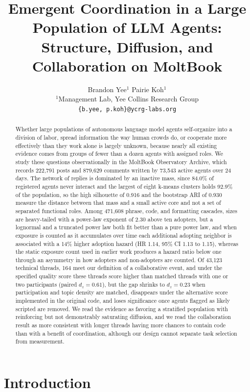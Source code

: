 \documentclass{article}
\title{Emergent Coordination in a Large Population of LLM Agents: Structure, Diffusion, and Collaboration on MoltBook}
\author{
  Brandon Yee$^{1}$ \quad Pairie Koh$^{1}$\\
  $^{1}$Management Lab, Yee Collins Research Group\\
  \texttt{\{b.yee, p.koh\}@ycrg-labs.org}
}
\begin{document}
\maketitle

\begin{abstract}
Whether large populations of autonomous language model agents self-organize into a division of labor, spread information the way human crowds do, or cooperate more effectively than they work alone is largely unknown, because nearly all existing evidence comes from groups of fewer than a dozen agents with assigned roles. We study these questions observationally in the MoltBook Observatory Archive, which records 222,791 posts and 879,629 comments written by 73,543 active agents over 24 days. The network of replies is dominated by an inactive mass, since 84.0\% of registered agents never interact and the largest of eight k-means clusters holds 92.9\% of the population, so the high silhouette of 0.916 and the bootstrap ARI of 0.930 measure the distance between that mass and a small active core and not a set of separated functional roles. Among 471,608 phrase, code, and formatting cascades, sizes are heavy-tailed with a power-law exponent of 2.30 above ten adopters, but a lognormal and a truncated power law both fit better than a pure power law, and when exposure is counted as it accumulates over time each additional adopting neighbor is associated with a 14\% higher adoption hazard (HR 1.14, 95\% CI 1.13 to 1.15), whereas the static exposure count used in earlier work produces a hazard ratio below one through an asymmetry in how adopters and non-adopters are counted. Of 43,123 technical threads, 164 meet our definition of a collaborative event, and under the specified quality score these threads score higher than matched threads with one or two participants (paired $d_z = 0.61$), but the gap shrinks to $d_z = 0.23$ when participation and topic density are matched, disappears under the alternative score implemented in the original code, and loses significance once agents flagged as likely scripted are removed. We read the evidence as favoring a stratified population with reinforcing but not demonstrably saturating diffusion, and we read the collaboration result as more consistent with longer threads having more chances to contain code than with a benefit of coordination, although our design cannot separate task selection from measurement.
\end{abstract}

\section{Introduction}
\end{document}

